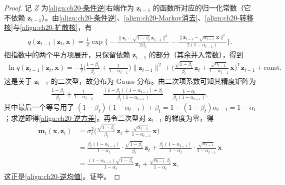 \documentclass[../../main.tex]{subfiles}
\begin{document}
\begin{proof}
记 $Z$ 为\eqref{align:ch20-条件逆}右端作为 $\bm{z}_{t-1}$ 的函数所对应的归一化常数（它不依赖 $\bm{z}_{t-1}$）。由\eqref{align:ch20-条件逆}、\eqref{align:ch20-Markov消去}、\eqref{align:ch20-转移核}与\eqref{align:ch20-扩散核}，有
\begin{align*}
q(\bm{z}_{t-1}\mid\bm{z}_t,\bm{x})=\frac{1}{Z}\exp\Big\{-\frac{\|\bm{z}_t-\sqrt{1-\beta_t}\,\bm{z}_{t-1}\|^2}{2\beta_t}-\frac{\|\bm{z}_{t-1}-\sqrt{\alpha_{t-1}}\,\bm{x}\|^2}{2(1-\alpha_{t-1})}\Big\}.
\end{align*}
把指数中的两个平方项展开，只保留依赖 $\bm{z}_{t-1}$ 的部分（其余并入常数），得到
\begin{align*}
\ln q(\bm{z}_{t-1}\mid\bm{z}_t,\bm{x})=-\frac{1}{2}\Big(\frac{1-\beta_t}{\beta_t}+\frac{1}{1-\alpha_{t-1}}\Big)\|\bm{z}_{t-1}\|^2+\Big(\frac{\sqrt{1-\beta_t}}{\beta_t}\,\bm{z}_t+\frac{\sqrt{\alpha_{t-1}}}{1-\alpha_{t-1}}\,\bm{x}\Big)^{\!\mathsf T}\bm{z}_{t-1}+\mathrm{const}.
\end{align*}
这是关于 $\bm{z}_{t-1}$ 的二次型，故分布为 Gauss 分布。由二次项系数可知其精度矩阵为
\begin{align*}
\frac{1-\beta_t}{\beta_t}+\frac{1}{1-\alpha_{t-1}}=\frac{(1-\beta_t)(1-\alpha_{t-1})+\beta_t}{\beta_t(1-\alpha_{t-1})}=\frac{1-\alpha_t}{\beta_t(1-\alpha_{t-1})},
\end{align*}
其中最后一个等号用了 $(1-\beta_t)(1-\alpha_{t-1})+\beta_t=1-(1-\beta_t)\alpha_{t-1}=1-\alpha_t$；求逆即得\eqref{align:ch20-逆方差}。再令二次型对 $\bm{z}_{t-1}$ 的梯度为零，得
\begin{align*}
\bm{m}_t(\bm{x},\bm{z}_t)&=\sigma_t^2\Big(\frac{\sqrt{1-\beta_t}}{\beta_t}\,\bm{z}_t+\frac{\sqrt{\alpha_{t-1}}}{1-\alpha_{t-1}}\,\bm{x}\Big)\\
&=\frac{\beta_t(1-\alpha_{t-1})}{1-\alpha_t}\cdot\frac{\sqrt{1-\beta_t}}{\beta_t}\,\bm{z}_t+\frac{\beta_t(1-\alpha_{t-1})}{1-\alpha_t}\cdot\frac{\sqrt{\alpha_{t-1}}}{1-\alpha_{t-1}}\,\bm{x}\\
&=\frac{(1-\alpha_{t-1})\sqrt{1-\beta_t}}{1-\alpha_t}\,\bm{z}_t+\frac{\sqrt{\alpha_{t-1}}\,\beta_t}{1-\alpha_t}\,\bm{x},
\end{align*}
这正是\eqref{align:ch20-逆均值}。证毕。
\end{proof}
\end{document}
